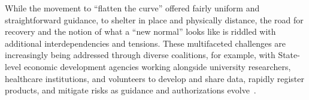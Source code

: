 While the movement to “flatten the curve” offered fairly uniform and straightforward guidance, to shelter in place and physically distance, the road for recovery and the notion of what a “new normal” looks like is riddled with additional interdependencies and tensions. These multifaceted challenges are increasingly being addressed through diverse coalitions, for example, with State-level economic development agencies working alongside university researchers, healthcare institutions, and volunteers to develop and share data, rapidly register products, and mitigate risks as guidance and authorizations evolve~\cite{doi:10.1056/NEJMc2009432,western}.


